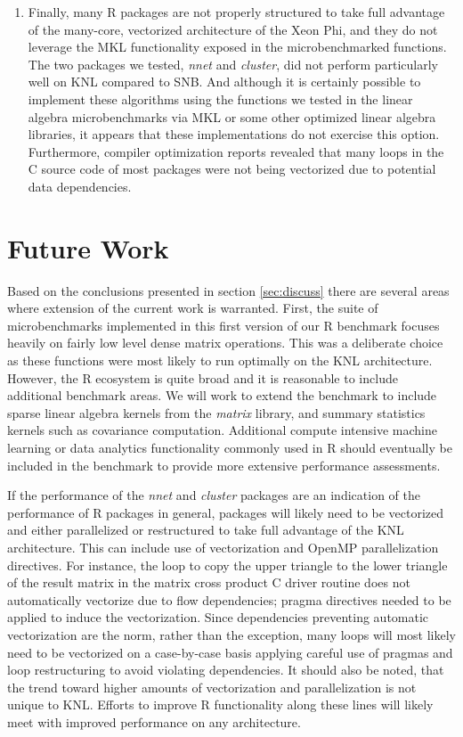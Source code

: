 \begin{enumerate}
\item Finally, many R packages are not properly structured to take full
advantage of the many-core, vectorized architecture of the Xeon Phi, and they do not
leverage the MKL functionality exposed in the microbenchmarked functions. The two
packages we tested, \textit{nnet} and \textit{cluster}, did not perform
particularly well on KNL compared to SNB. And although it is certainly possible to
implement these algorithms using the functions we tested in the linear algebra
microbenchmarks via MKL or some other optimized linear algebra libraries, it appears that
these implementations do not exercise this option.  Furthermore, compiler optimization
reports revealed that many loops in the C source code of most packages were not being
vectorized due to potential data dependencies.

\end{enumerate}

\section{Future Work} \label{sec:future}
Based on the conclusions presented in section \ref{sec:discuss} there are several areas
where extension of the current work is warranted. First, the suite of microbenchmarks
implemented in this first version of our R benchmark focuses heavily on fairly low level
dense matrix operations. This was a deliberate choice as these functions were most likely
to run optimally on the KNL architecture. However, the R ecosystem is quite broad and it
is reasonable to include additional benchmark areas.
We will work to extend the benchmark to include sparse linear algebra kernels from the
\textit{matrix} library, and summary statistics kernels such as covariance computation.
Additional compute intensive machine learning or data analytics functionality commonly
used in R should eventually be included in the benchmark to provide more extensive
performance assessments.

If the performance of the \textit{nnet} and \textit{cluster}
packages are an indication of the performance of R packages in general, packages will
likely need to be vectorized and either parallelized or restructured to take full
advantage of the KNL architecture.  This can include use of vectorization and OpenMP parallelization
directives.  For instance, the loop to copy the upper triangle
to the lower triangle of the result matrix in the matrix cross product C driver routine
does not automatically vectorize due to flow dependencies; pragma directives
needed to be applied to induce the vectorization.  Since dependencies preventing
automatic vectorization are the norm, rather than the exception, many loops will
most likely need to be vectorized on a case-by-case basis applying careful use of
pragmas and loop restructuring to avoid violating dependencies.  
It should also be noted, that the trend toward higher amounts of vectorization and
parallelization is not unique to KNL.  Efforts to improve R functionality along these
lines will likely meet with improved performance on any architecture.

